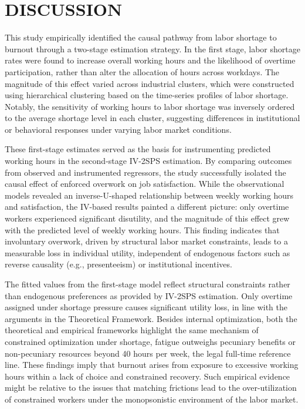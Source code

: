 \documentclass[
  12pt,
]{article}
\begin{document}
\newpage

\section{DISCUSSION}\label{discussion}

This study empirically identified the causal pathway from labor shortage
to burnout through a two-stage estimation strategy. In the first stage,
labor shortage rates were found to increase overall working hours and
the likelihood of overtime participation, rather than alter the
allocation of hours across workdays. The magnitude of this effect varied
across industrial clusters, which were constructed using hierarchical
clustering based on the time-series profiles of labor shortage. Notably,
the sensitivity of working hours to labor shortage was inversely ordered
to the average shortage level in each cluster, suggesting differences in
institutional or behavioral responses under varying labor market
conditions.

These first-stage estimates served as the basis for instrumenting
predicted working hours in the second-stage IV-2SPS estimation. By
comparing outcomes from observed and instrumented regressors, the study
successfully isolated the causal effect of enforced overwork on job
satisfaction. While the observational models revealed an
inverse-U-shaped relationship between weekly working hours and
satisfaction, the IV-based results painted a different picture: only
overtime workers experienced significant disutility, and the magnitude
of this effect grew with the predicted level of weekly working hours.
This finding indicates that involuntary overwork, driven by structural
labor market constraints, leads to a measurable loss in individual
utility, independent of endogenous factors such as reverse causality
(e.g., presenteeism) or institutional incentives.

The fitted values from the first-stage model reflect structural
constraints rather than endogenous preferences as provided by IV-2SPS
estimation. Only overtime assigned under shortage pressure causes
significant utility loss, in line with the arguments in the Theoretical
Framework. Besides internal optimization, both the theoretical and
empirical frameworks highlight the same mechanism of constrained
optimization under shortage, fatigue outweighs pecuniary benefits or
non-pecuniary resources beyond 40 hours per week, the legal full-time
reference line. These findings imply that burnout arises from exposure
to excessive working hours within a lack of choice and constrained
recovery. Such empirical evidence might be relative to the issues that
matching frictions lead to the over-utilization of constrained workers
under the monopsonistic environment of the labor market.
\end{document}
